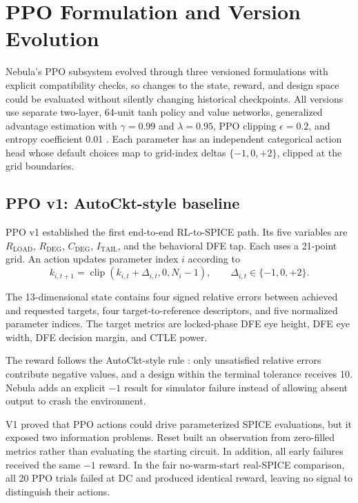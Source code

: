 \chapter{PPO Formulation and Version Evolution}

Nebula's PPO subsystem evolved through three versioned formulations with
explicit compatibility checks, so changes to the state, reward, and design space
could be evaluated without silently changing historical checkpoints. All versions use separate two-layer, 64-unit tanh policy
and value networks, generalized advantage estimation with $\gamma=0.99$ and
$\lambda=0.95$, PPO clipping $\epsilon=0.2$, and entropy coefficient 0.01
\citep{schulman2017ppo,schulman2016gae}. Each parameter has an independent
categorical action head whose default choices map to grid-index deltas
$\{-1,0,+2\}$, clipped at the grid boundaries.

\section{PPO v1: AutoCkt-style baseline}

PPO v1 established the first end-to-end RL-to-SPICE path. Its five variables are
$R_{\mathrm{LOAD}}$, $R_{\mathrm{DEG}}$, $C_{\mathrm{DEG}}$,
$I_{\mathrm{TAIL}}$, and the behavioral DFE tap. Each uses a 21-point grid. An
action updates parameter index $i$ according to
\begin{equation}
  k_{i,t+1}=\operatorname{clip}\!\left(k_{i,t}+\Delta_{i,t},0,N_i-1\right),
  \qquad \Delta_{i,t}\in\{-1,0,+2\}.
\end{equation}

The 13-dimensional state contains four signed relative errors between achieved
and requested targets, four target-to-reference descriptors, and five normalized
parameter indices. The target metrics are locked-phase DFE eye height, DFE eye
width, DFE decision margin, and CTLE power.

The reward follows the AutoCkt-style rule \citep{wang2020autockt}: only
unsatisfied relative errors contribute negative values, and a design within the
terminal tolerance receives 10. Nebula adds an explicit $-1$ result for simulator
failure instead of allowing absent output to crash the environment.

V1 proved that PPO actions could drive parameterized SPICE evaluations, but it
exposed two information problems. Reset built an observation from zero-filled
metrics rather than evaluating the starting circuit. In addition, all early
failures received the same $-1$ reward. In the fair no-warm-start real-SPICE
comparison, all 20 PPO trials failed at DC and produced identical reward, leaving
no signal to distinguish their actions.


